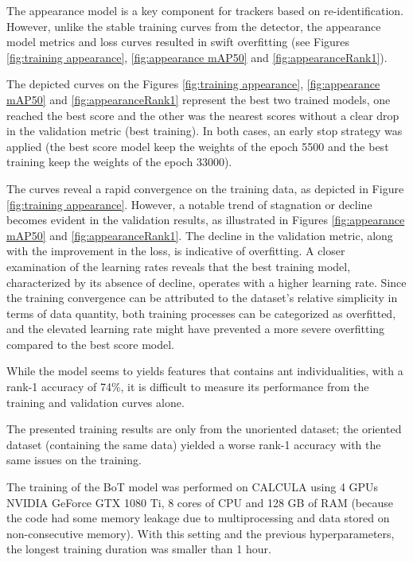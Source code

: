 

{
    The appearance model is a key component for trackers based on re-identification. 
    However, unlike the stable training curves from the detector, the appearance model metrics and loss curves resulted in swift overfitting (see Figures \ref{fig:training appearance}, \ref{fig:appearance mAP50} and \ref{fig:appearanceRank1}).
}

{
    The depicted curves on the Figures \ref{fig:training appearance}, \ref{fig:appearance mAP50} and \ref{fig:appearanceRank1} represent the best two trained models, 
	one reached the best score and the other was the nearest scores without a clear drop in the validation metric (best training). 
	In both cases, an early stop strategy was applied (the best score model keep the weights of the epoch 5500 and the best training keep the weights of the epoch 33000).
}

{
	The curves reveal a rapid convergence on the training data, as depicted in Figure \ref{fig:training appearance}. 
	However, a notable trend of stagnation or decline becomes evident in the validation results, as illustrated in Figures \ref{fig:appearance mAP50} and \ref{fig:appearanceRank1}. 
	The decline in the validation metric, along with the improvement in the loss, is indicative of overfitting.
	A closer examination of the learning rates reveals that the best training model, characterized by its absence of decline, operates with a higher learning rate. 
	Since the training convergence can be attributed to the dataset's relative simplicity in terms of data quantity, 
	both training processes can be categorized as overfitted, and the elevated learning rate might have prevented a more severe overfitting compared to the best score model.
}

{
    While the model seems to yields features that contains ant individualities, with a rank-1 accuracy of 74\%, 
	it is difficult to measure its performance from the training and validation curves alone.
}

{
    The presented training results are only from the unoriented dataset; the oriented dataset (containing the same data) yielded a worse rank-1 accuracy with the same issues on the training.
}

\needspace{0.1\textheight}

{
    The training of the \ac{BoT} model was performed on CALCULA using 4 GPUs NVIDIA GeForce GTX 1080 Ti, 8 cores of CPU and 128 GB of RAM (because the code had some memory leakage due to multiprocessing and data stored on non-consecutive memory). With this setting and the previous hyperparameters, the longest training duration was smaller than 1 hour.
}

